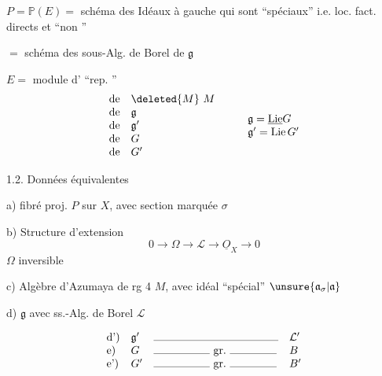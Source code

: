 $P=\mathbb P(E)=$ schéma des Idéaux à gauche
qui sont ``spéciaux'' i.e. loc. fact. directs et
``non \uline{}''

$=$ schéma des sous-Alg. de Borel de $\mathfrak g$

$E=$ module d' ``rep. ''
\[
\begin{array}{ll}
\text{de}&\deleted{M}\ M\\
\text{de}&\mathfrak g\\
\text{de}&\mathfrak g'\\
\text{de}&G\\
\text{de}&G'
\end{array}
\qquad
\begin{array}{l}
\mathfrak g=\underline{\operatorname{Lie}}G\\
\mathfrak g'=\operatorname{Lie}G'
\end{array}
\]

1.2. Données équivalentes

a) fibré  
proj. $P$ sur $X$, avec section marquée $\sigma$

b) Structure d'extension
\[
0\longrightarrow\Omega\longrightarrow\mathcal L
\longrightarrow\underline O_X\longrightarrow0
\]
$\Omega$ inversible

c) Algèbre d'Azumaya de rg 4 $M$, avec idéal
 ``spécial''
$\unsure{\mathfrak a_\sigma|\mathfrak a}$

d) $\mathfrak g$ avec ss.-Alg. de Borel $\mathcal L$

\[
\begin{array}{llll}
\text{d')}&\mathfrak g'&\rule{4cm}{.3pt}&\mathcal L'\\
\text{e)}&G&\rule{1.8cm}{.3pt}\ \text{gr.}\ \rule{1.5cm}{.3pt}&B\\
\text{e')}&G'&\rule{1.8cm}{.3pt}\ \text{gr.}\ \rule{1.5cm}{.3pt}&B'
\end{array}
\]

